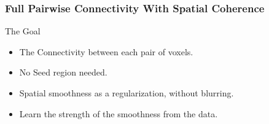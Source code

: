 \documentclass[serif]{beamer}
\begin{document}
\begin{frame}
\frametitle{Full Pairwise Connectivity With Spatial Coherence~\cite{liu2010spatialCopy}}
\begin{block}{The Goal}
  \begin{itemize}
  \item The Connectivity between each pair of voxels.
  \item No Seed region needed.
  \item Spatial smoothness as a regularization, without blurring.
  \item \alert{Learn} the strength of the smoothness from the data.
  \end{itemize}
\end{block}
\end{frame}
\end{document}
